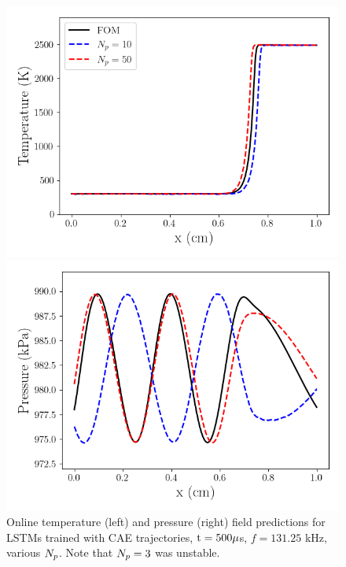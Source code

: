\begin{figure}
    \begin{minipage}{0.49\linewidth}
        \includegraphics[width=0.99\linewidth]{Chapters/TransientFlame/Images/lstm/cae_rom_temp_snaps.png}
    \end{minipage}
    \begin{minipage}{0.49\linewidth}
        \includegraphics[width=0.99\linewidth]{Chapters/TransientFlame/Images/lstm/cae_rom_press_snaps.png}
    \end{minipage}
    \caption{Online temperature (left) and pressure (right) field predictions for LSTMs trained with CAE trajectories, $\text{t} = 500 \mu$s, $f = 131.25$ kHz, various $N_p$. Note that $N_p = 3$ was unstable.}
\end{figure}

